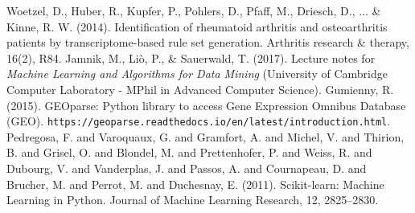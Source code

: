 \documentclass[11pt]{article}
\numberwithin{equation}{section}
\begin{document}
\newpage
\medskip
\begin{thebibliography}{9}
Woetzel, D., Huber, R., Kupfer, P., Pohlers, D., Pfaff, M., Driesch, D., ... \& Kinne, R. W. (2014). Identification of rheumatoid arthritis and osteoarthritis patients by transcriptome-based rule set generation. Arthritis research \& therapy, 16(2), R84.
Jamnik, M., Li\`o, P., \& Sauerwald, T. (2017). Lecture notes for \textit{Machine Learning and Algorithms for Data Mining} (University of Cambridge Computer Laboratory - MPhil in Advanced Computer Science).
Gumienny, R. (2015). GEOparse: Python library to access Gene Expression Omnibus Database (GEO). \texttt{https://geoparse.readthedocs.io/en/latest/introduction.html}.
Pedregosa, F. and Varoquaux, G. and Gramfort, A. and Michel, V. and Thirion, B. and Grisel, O. and Blondel, M. and Prettenhofer, P. and Weiss, R. and Dubourg, V. and Vanderplas, J. and Passos, A. and Cournapeau, D. and Brucher, M. and Perrot, M. and Duchesnay, E. (2011). Scikit-learn: Machine Learning in Python. Journal of Machine Learning Research, 12, 2825--2830.

\end{thebibliography}
\end{document}
